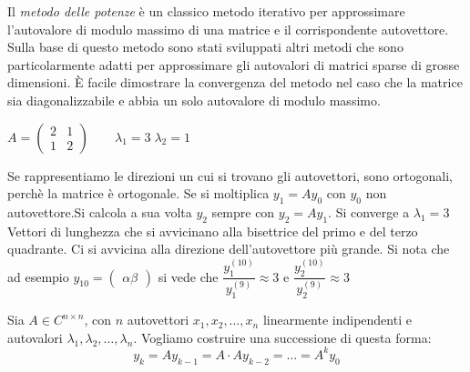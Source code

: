 Il \emph{metodo delle potenze} \`e  un classico metodo iterativo per
approssimare l'autovalore di modulo massimo di una matrice e il corrispondente
autovettore. Sulla base di questo metodo sono stati sviluppati altri metodi
che sono
particolarmente adatti per approssimare gli autovalori di matrici sparse di
grosse dimensioni. \`E  facile dimostrare la convergenza del metodo nel caso
che la matrice sia diagonalizzabile e abbia un solo autovalore di modulo
massimo.
\begin{example}
  $A =
  \begin{pmatrix}
    2 & 1 \\
    1 & 2
  \end{pmatrix}
  \qquad 
  \lambda_1 = 3 \; \lambda_2 = 1
  $

Se rappresentiamo le direzioni un cui si trovano gli autovettori, sono
ortogonali, perch\`e la matrice \`e ortogonale.
Se si moltiplica $y_1 = Ay_0$ con $y_0$ non autovettore.Si calcola a
sua volta $y_2$ sempre con $y_2 = Ay_1$. Si converge a $\lambda_1 = 3$
Vettori di lunghezza che si avvicinano alla bisettrice del primo e del
terzo quadrante.
Ci si avvicina alla direzione dell'autovettore pi\`u grande. Si nota
che ad esempio
$y_{10} =
\begin{pmatrix}
  \alpha
  \beta
\end{pmatrix}
$
si vede che
$\dfrac{y_1^{(10)}}{y_1^{(9)}} \approx 3$
e
$\dfrac{y_2^{(10)}}{y_2^{(9)}} \approx 3$
\end{example}
 
Sia $A \in C^{n \times n}$, con $n$ autovettori $x_1, x_2,\ldots, x_n$
linearmente indipendenti e autovalori $\lambda_1, \lambda_2 , \ldots,
\lambda_n$. Vogliamo costruire una successione di questa forma:
$$ y_k = A y_{k-1} = A \cdot A y_{k-2} = \ldots = A^{k} y_0$$

